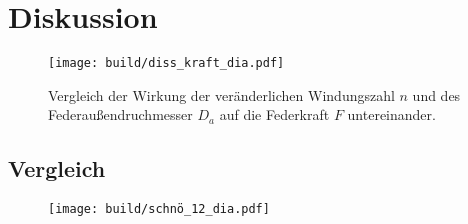 \newpage
\section{Diskussion}

\begin{figure}
    \center
    \texttt{[image: build/diss\_kraft\_dia.pdf]}
    \caption{
        Vergleich der Wirkung der veränderlichen Windungszahl $n$ und
        des Federaußendruchmesser $D_a$ auf die Federkraft $F$ untereinander.
    }
\end{figure}

\subsection{Vergleich}

\begin{figure}[H]
    \center
    \texttt{[image: build/schnö\_12\_dia.pdf]}
    \caption{}
\end{figure}

\label{sec:Diskussion}
